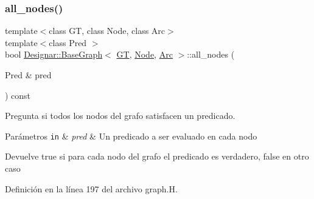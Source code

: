 \subsubsection{\texorpdfstring{all\+\_\+nodes()}{all\_nodes()}\hspace{0.1cm}{\footnotesize\ttfamily [1/2]}}
{\footnotesize\ttfamily template$<$class GT, class Node, class Arc$>$ \\
template$<$class Pred $>$ \\
bool \hyperlink{class_designar_1_1_base_graph}{Designar\+::\+Base\+Graph}$<$ \hyperlink{demo-buildgraph_8_c_a3001c40d2c31ca87ed96cd7d1334a55e}{GT}, \hyperlink{namespace_designar_a5af326c65aa2bd26b26c410f2030d09e}{Node}, \hyperlink{namespace_designar_a3f55fb5513d62ff47cbc8f72b8e95d6f}{Arc} $>$\+::all\+\_\+nodes (\begin{DoxyParamCaption}\item[{Pred \&}]{pred }\end{DoxyParamCaption}) const\hspace{0.3cm}{\ttfamily [inline]}}



Pregunta si todos los nodos del grafo satisfacen un predicado. 


\begin{DoxyParams}[1]{Parámetros}
\mbox{\tt in}  & {\em pred} & Un predicado a ser evaluado en cada nodo \\
\hline
\end{DoxyParams}
\begin{DoxyReturn}{Devuelve}
{\ttfamily true} si para cada nodo del grafo el predicado es verdadero, {\ttfamily false} en otro caso 
\end{DoxyReturn}


Definición en la línea 197 del archivo graph.\+H.

\mbox{\label{class_designar_1_1_base_graph_a32419ec17712a60c1964bc91e78d135c}} 
